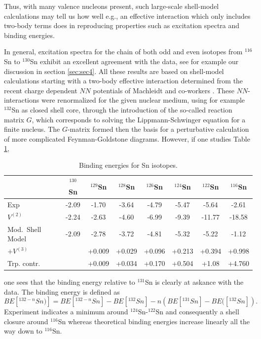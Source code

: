 \documentclass{article}
\begin{document}
Thus, with many valence nucleons present, such
large-scale shell-model calculations may
tell us how well e.g., an effective interaction
which only includes two-body terms does in
reproducing properties such as excitation spectra and
binding energies. 

In general, 
excitation spectra for the chain of both odd and
even isotopes from  
$^{116}$Sn to $^{130}$Sn exhibit an excellent agreement
with the data, see for example our discussion in section \ref{sec:sec4}.
All these results are
based on shell-model calculations starting with
a two-body effective interaction determined from the 
recent charge dependent $NN$ potentials of Machleidt
and co-workers \cite{cdbonn,cdbonn2000}. These $NN$-interactions
were renormalized for the given nuclear medium, using for example $^{132}$Sn as closed
shell core, through
the introduction of the so-called reaction matrix $G$,
which corresponds to solving the Lippmann-Schwinger
equation for a finite nucleus. The $G$-matrix formed then
the basis for a perturbative calculation of more complicated
Feynman-Goldstone diagrams.
However, if one studies Table \ref{tab:tablesnbe},
\begin{table}[htbp]
     \caption{Binding energies for Sn isotopes.}
     \label{tab:tablesnbe}
     \begin{center}
\begin{tabular}{|l|ccccccc|} \hline
& $^{130}$Sn& $^{129}$Sn& $^{128}$Sn& $^{126}$Sn& $^{124}$Sn& $^{122}$Sn& $^{116}$Sn\\
\hline
Exp& -2.09& -1.70& -3.64& -4.79&-5.47&-5.64&-2.61\\
$V^{(2)}$& -2.24& -2.63& -4.60& -6.99&-9.39&-11.77& -18.58\\
Mod.\ Shell Model &-2.09&-2.78& -3.72&-4.81&-5.32& -5.22& -1.12\\
$+V^{(3)}$&  & +0.009& +0.029& +0.096& +0.213& +0.394&+0.998\\ 
Trp. contr.& & +0.009& +0.034& +0.170& +0.504&+1.08&+4.760\\\hline
      \end{tabular}
     \end{center}
\end{table}
one sees that the binding energy relative to $^{131}$Sn  
is clearly at askance with the data. 
The binding energy is defined as
\begin{equation}
      BE[^{132 - n}Sn)] = BE[^{132 - n}Sn] - BE[^{132}Sn] 
      - n  \left (BE[^{131}Sn] -  BE([^{132}Sn] \right ).
\end{equation}
Experiment indicates a minimum around $^{124}$Sn-$^{122}$Sn and consequently
a shell closure around $^{116}$Sn whereas theoretical 
binding energies increase linearly all the way 
down to $^{116}$Sn. 
\end{document}
